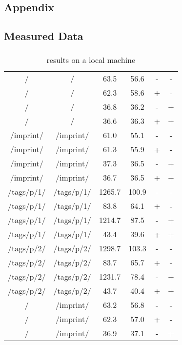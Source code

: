 \begin{appendix}
\section{Appendix}
\subsection{Measured Data}
\subsubsection{\curl{}}
\begin{center}
\footnotesize
\begin{longtable}{cccccc}
    \caption{\curl{} results on a local machine}
    \\
	\hline
	\thead{From} & \thead{To} & \thead{Common} & \thead{\lare{}} & \thead{DC} & \thead{TC} \\
	\hline
/ & / & 63.5 & 56.6 & - & - \\
/ & / & 62.3 & 58.6 & + & - \\
/ & / & 36.8 & 36.2 & - & + \\
/ & / & 36.6 & 36.3 & + & + \\
\hline
/imprint/ & /imprint/ & 61.0 & 55.1 & - & - \\
/imprint/ & /imprint/ & 61.3 & 55.9 & + & - \\
/imprint/ & /imprint/ & 37.3 & 36.5 & - & + \\
/imprint/ & /imprint/ & 36.7 & 36.5 & + & + \\
\hline
/tags/p/1/ & /tags/p/1/ & 1265.7 & 100.9 & - & - \\
/tags/p/1/ & /tags/p/1/ & 83.8 & 64.1 & + & - \\
/tags/p/1/ & /tags/p/1/ & 1214.7 & 87.5 & - & + \\
/tags/p/1/ & /tags/p/1/ & 43.4 & 39.6 & + & + \\
\hline
/tags/p/2/ & /tags/p/2/ & 1298.7 & 103.3 & - & - \\
/tags/p/2/ & /tags/p/2/ & 83.7 & 65.7 & + & - \\
/tags/p/2/ & /tags/p/2/ & 1231.7 & 78.4 & - & + \\
/tags/p/2/ & /tags/p/2/ & 43.7 & 40.4 & + & + \\
\hline
\hline
/ & /imprint/ & 63.2 & 56.8 & - & - \\
/ & /imprint/ & 62.3 & 57.0 & + & - \\
/ & /imprint/ & 36.9 & 37.1 & - & + \\

\end{longtable}
\end{center}
\end{appendix}

